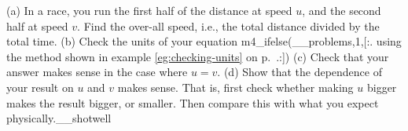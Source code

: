 (a) In a race, you run the first half of the distance at speed $u$,
and the second half at speed $v$. Find the over-all speed, i.e.,
the total distance divided by the total time.\answercheck\hwendpart
%
(b) Check the units of your equation%
m4_ifelse(__problems,1,[:.%
using the method shown in example \ref{eg:checking-units} on p.~\pageref{eg:checking-units}.:])
\hwendpart
%
(c) Check that your answer makes sense in the case where $u=v$.\hwendpart
%
(d) Show that the dependence of your result on $u$ and $v$ makes sense. That is, first
check whether making $u$ bigger makes the result bigger, or smaller. Then compare this
with what you expect physically.__shotwell
